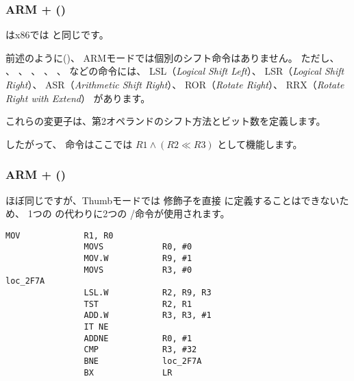 ﻿\subsubsection{ARM + \OptimizingXcodeIV (\ARMMode)}



\TST はx86では \TEST と同じです。

前述のように()、
ARMモードでは個別のシフト命令はありません。
ただし、 \MOV 、 \TST 、 \CMP 、 \ADD 、 \SUB 、 \RSB などの命令には、
LSL（\emph{Logical Shift Left}）、
LSR（\emph{Logical Shift Right}）、
ASR（\emph{Arithmetic Shift Right}）、
ROR（\emph{Rotate Right}）、
RRX（\emph{Rotate Right with Extend}） 
があります。

これらの変更子は、第2オペランドのシフト方法とビット数を定義します。

したがって、 命令はここでは $R1 \land (R2 \ll R3)$ として機能します。

\subsubsection{ARM + \OptimizingXcodeIV (\ThumbTwoMode)}

ほぼ同じですが、Thumbモードでは \LSL 修飾子を直接 \TST に定義することはできないため、
1つの \TST の代わりに2つの /\TST 命令が使用されます。

\begin{lstlisting}[label=ARM_leaf_example5,style=customasmARM]
                MOV             R1, R0
                MOVS            R0, #0
                MOV.W           R9, #1
                MOVS            R3, #0
loc_2F7A
                LSL.W           R2, R9, R3
                TST             R2, R1
                ADD.W           R3, R3, #1
                IT NE
                ADDNE           R0, #1
                CMP             R3, #32
                BNE             loc_2F7A
                BX              LR
\end{lstlisting}

